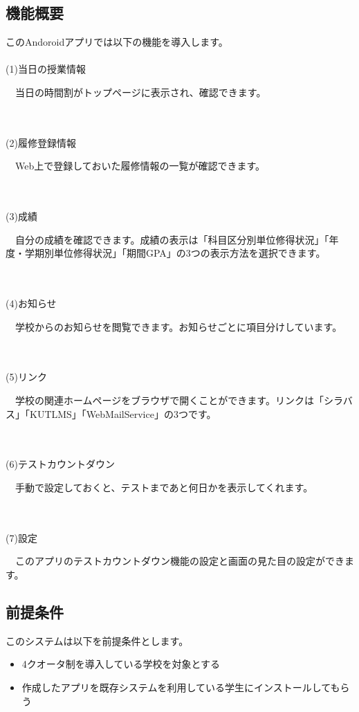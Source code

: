 \subsection{機能概要}
このAndoroidアプリでは以下の機能を導入します。\\ \\
(1)当日の授業情報\\
\hspace{5mm}
\begin{minipage}[h]{145mm}
　当日の時間割がトップページに表示され、確認できます。
\end{minipage}
\\ \\
(2)履修登録情報\\
\hspace{5mm}
\begin{minipage}[h]{145mm}
　Web上で登録しておいた履修情報の一覧が確認できます。
\end{minipage}
\\ \\
(3)成績\\
\hspace{5mm}
\begin{minipage}[h]{145mm}
　自分の成績を確認できます。成績の表示は「科目区分別単位修得状況」「年度・学期別単位修得状況」「期間GPA」の3つの表示方法を選択できます。
\end{minipage}
\\ \\
(4)お知らせ\\
\hspace{5mm}
\begin{minipage}[h]{145mm}
　学校からのお知らせを閲覧できます。お知らせごとに項目分けしています。
\end{minipage}
\\ \\
(5)リンク\\
\hspace{5mm}
\begin{minipage}[h]{145mm}
　学校の関連ホームページをブラウザで開くことができます。リンクは「シラバス」「KUTLMS」「WebMailService」の3つです。
\end{minipage}
\\ \\
(6)テストカウントダウン\\
\hspace{5mm}
\begin{minipage}[h]{145mm}
　手動で設定しておくと、テストまであと何日かを表示してくれます。
\end{minipage}
\\ \\
(7)設定\\
\hspace{5mm}
\begin{minipage}[h]{145mm}
 　このアプリのテストカウントダウン機能の設定と画面の見た目の設定ができます。
\end{minipage}

\subsection{前提条件}
このシステムは以下を前提条件とします。
\begin{itemize}
\item 4クオータ制を導入している学校を対象とする
\item 作成したアプリを既存システムを利用している学生にインストールしてもらう
\end{itemize}
